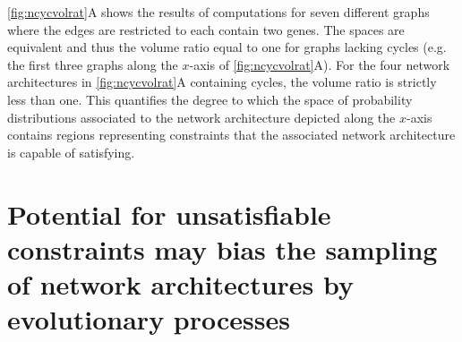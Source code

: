 \ref{fig:ncycvolrat}A shows the results of computations for seven different graphs where the edges are restricted to each contain two genes. The spaces are equivalent and thus the volume ratio equal to one for graphs lacking cycles (e.g. the first three graphs along the $x$-axis of \ref{fig:ncycvolrat}A). For the four network architectures in \ref{fig:ncycvolrat}A containing cycles, the volume ratio is strictly less than one. This quantifies the degree to which the space of probability distributions associated to the network architecture depicted along the $x$-axis contains regions representing constraints that the associated network architecture is capable of satisfying.

\section{Potential for unsatisfiable constraints may bias the sampling of network architectures by evolutionary processes}\label{sec:unsatisfiableconstrevolution}


